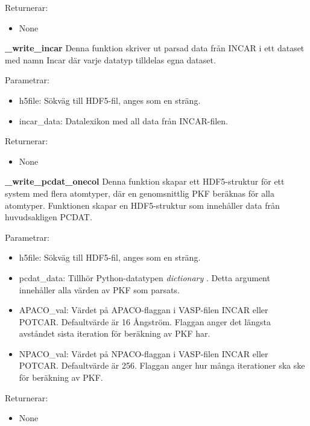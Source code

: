 \documentclass[10pt,oneside,swedish]{article}
\providecommand{\tightlist}{%
  \setlength{\itemsep}{0pt}\setlength{\parskip}{0pt}}
\begin{document}
Returnerar:

\begin{itemize}
\tightlist
\item
  None
\end{itemize}

\textbf{\_write\_incar} Denna funktion skriver ut parsad data från INCAR
i ett dataset med namn Incar där varje datatyp tilldelas egna dataset.

Parametrar:

\begin{itemize}
\tightlist
\item
  h5file: Sökväg till HDF5-fil, anges som en sträng.
\item
  incar\_data: Datalexikon med all data från INCAR-filen.
\end{itemize}

Returnerar:

\begin{itemize}
\tightlist
\item
  None
\end{itemize}

\textbf{\_write\_pcdat\_onecol} Denna funktion skapar ett HDF5-struktur
för ett system med flera atomtyper, där en genomsnittlig PKF beräknas
för alla atomtyper. Funktionen skapar en HDF5-struktur som innehåller
data från huvudsakligen PCDAT.

Parametrar:

\begin{itemize}
\tightlist
\item
  h5file: Sökväg till HDF5-fil, anges som en sträng.
\item
  pcdat\_data: Tillhör Python-datatypen \emph{dictionary} \cite{dict}.
  Detta argument innehåller alla värden av PKF som parsats.
\item
  APACO\_val: Värdet på APACO-flaggan i VASP-filen INCAR eller POTCAR.
  Defaultvärde är 16 Ångström. Flaggan anger det längsta avståndet sista
  iteration för beräkning av PKF har.
\item
  NPACO\_val: Värdet på NPACO-flaggan i VASP-filen INCAR eller POTCAR.
  Defaultvärde är 256. Flaggan anger hur många iterationer ska ske för
  beräkning av PKF.
\end{itemize}

Returnerar:

\begin{itemize}
\tightlist
\item
  None
\end{itemize}
\end{document}
